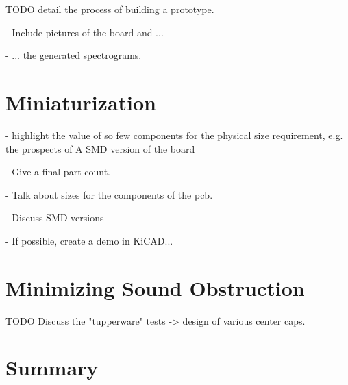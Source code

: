 TODO detail the process of building a prototype.

- Include pictures of the board and ...

- ... the generated spectrograms.


\section{Miniaturization}
- highlight the value of so few components for the physical size requirement, e.g. the prospects of A SMD version of the board

- Give a final part count.

- Talk about sizes for the components of the pcb.

- Discuss SMD versions

- If possible, create a demo in KiCAD...

\section{Minimizing Sound Obstruction}
TODO Discuss the "tupperware" tests -> design of various center caps.

\section{Summary}
